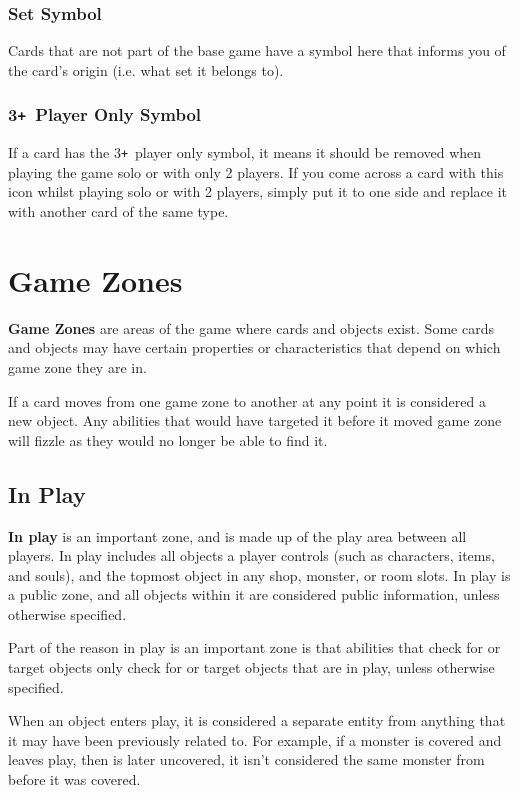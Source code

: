 \documentclass[a4paper, twoside]{report} %
\def\plus{\texttt{+}}
\begin{document}
    \subsection*{Set Symbol}
    Cards that are not part of the base game have a symbol here that informs you of the card’s origin (i.e. what set it belongs to).
    \subsection*{3\plus\ Player Only Symbol}
    If a card has the 3\plus\ player only symbol, it means it should be removed when playing the game solo or with only 2 players. If you come across a card with this icon whilst playing solo or with 2 players, simply put it to one side and replace it with another card of the same type.

    \chapter{Game Zones}
    \label{zones}
    \textbf{Game Zones} are areas of the game where cards and objects exist. Some cards and objects may have certain properties or characteristics that depend on which game zone they are in.

    If a card moves from one game zone to another at any point it is considered a new object. Any abilities that would have targeted it before it moved game zone will fizzle as they would no longer be able to find it.

    \section{In Play}
    \textbf{In play} is an important zone, and is made up of the play area between all players. In play includes all objects a player controls (such as characters, items, and souls), and the topmost object in any shop, monster, or room slots. In play is a public zone, and all objects within it are considered public information, unless otherwise specified.

    Part of the reason in play is an important zone is that abilities that check for or target objects only check for or target objects that are in play, unless otherwise specified.

    When an object enters play, it is considered a separate entity from anything that it may have been previously related to. For example, if a monster is covered and leaves play, then is later uncovered, it isn’t considered the same monster from before it was covered.
\end{document}
